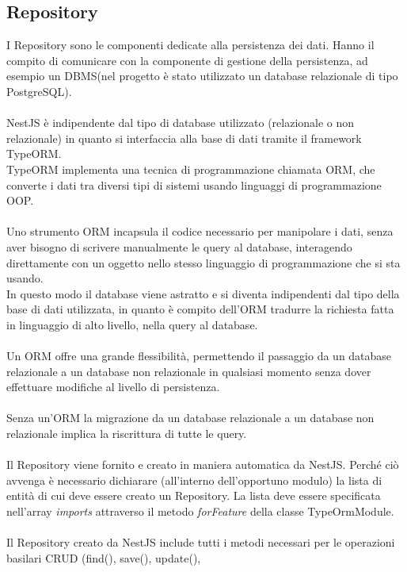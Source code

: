 \subsection{Repository}
I Repository sono le componenti dedicate alla persistenza dei dati. Hanno il compito di
comunicare con la componente di gestione della persistenza, ad esempio un \gls{DBMS}\glsfirstoccur (nel progetto è stato 
utilizzato un database
relazionale di tipo PostgreSQL).
\\\\
NestJS è indipendente dal tipo di database utilizzato (relazionale o non relazionale) in quanto si interfaccia
alla base di dati tramite il framework TypeORM. 
\\
TypeORM implementa una tecnica di programmazione chiamata 
\gls{ORM}\glsfirstoccur, che converte i dati tra diversi tipi di sistemi usando linguaggi di programmazione \gls{OOP}\glsfirstoccur.
\\\\
Uno strumento \gls{ORM} incapsula il codice necessario per manipolare i dati, senza aver bisogno di scrivere manualmente
le query al database, interagendo direttamente con un oggetto nello stesso linguaggio di programmazione che si sta usando. 
\\
In questo modo il database viene astratto e si diventa indipendenti dal tipo della base di dati utilizzata, in quanto è compito dell'\gls{ORM}
tradurre la richiesta fatta in linguaggio di alto livello, nella query al database. 
\\\\
Un \gls{ORM} offre una grande flessibilità, permettendo il passaggio da un database
relazionale a un database non relazionale in qualsiasi momento senza dover effettuare modifiche al livello di persistenza.
\\\\
Senza un'\gls{ORM} la migrazione da un database relazionale a un database non relazionale implica la riscrittura di tutte le query.
\\\\
Il Repository viene fornito e creato in maniera automatica da NestJS. Perché ciò avvenga è necessario
dichiarare (all'interno dell'opportuno modulo) la lista di entità di cui deve essere creato un Repository.
La lista deve essere specificata nell'array \textit{imports} attraverso 
il metodo \textit{forFeature} della classe TypeOrmModule.
\\\\
Il Repository creato da NestJS include tutti i metodi necessari per le operazioni basilari \gls{CRUD} (find(), save(), update(), 
